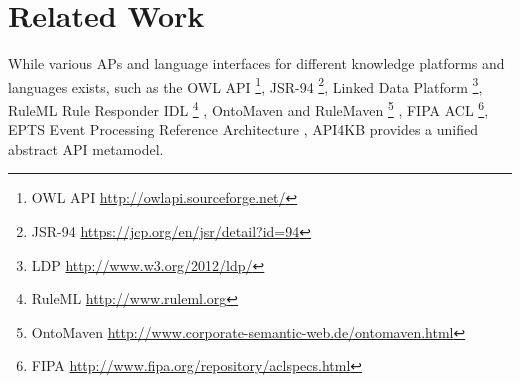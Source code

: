 \documentclass[runningheads]{llncs}
\begin{document}
\vspace{-0.4cm}
\section{Related Work}
\label{sec:related}




While various APs and language interfaces for different knowledge platforms and languages exists, such as the OWL API \footnote{OWL API \url{http://owlapi.sourceforge.net/}}, JSR-94 \footnote{JSR-94 \url{https://jcp.org/en/jsr/detail?id=94}}, Linked Data Platform \footnote{LDP \url{http://www.w3.org/2012/ldp/}}, RuleML Rule Responder IDL \footnote{RuleML \url{http://www.ruleml.org}} \cite{PaschkeBKC07}, OntoMaven and RuleMaven \footnote{OntoMaven \url{http://www.corporate-semantic-web.de/ontomaven.html}} \cite{Paschke13r},  FIPA ACL \footnote{FIPA \url{http://www.fipa.org/repository/aclspecs.html}}, EPTS Event Processing Reference Architecture \cite{PaschkeVS11},  API4KB provides a unified abstract API metamodel.

\end{document}
